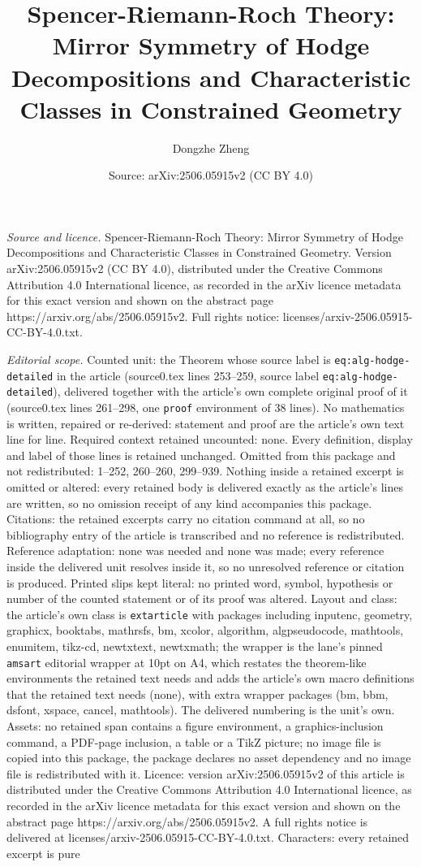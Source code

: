 \documentclass[10pt,a4paper]{amsart}
\title[Spencer-Riemann-Roch Theory: Mirror Symmetry of Hodge Decomp]{Spencer-Riemann-Roch Theory: Mirror Symmetry of Hodge Decompositions and Characteristic Classes in Constrained Geometry}
\author{Dongzhe Zheng}
\date{Source: arXiv:2506.05915v2 (CC BY 4.0)}
\begin{document}
\maketitle

\noindent\emph{Source and licence.} Spencer-Riemann-Roch Theory: Mirror Symmetry of Hodge Decompositions and Characteristic Classes in Constrained Geometry. Version arXiv:2506.05915v2 (CC BY 4.0), distributed under the Creative Commons Attribution 4.0 International licence, as recorded in the arXiv licence metadata for this exact version and shown on the abstract page https://arxiv.org/abs/2506.05915v2. Full rights notice: licenses/arxiv-2506.05915-CC-BY-4.0.txt.\par\smallskip

\noindent\textit{Editorial scope.} Counted unit: the Theorem whose source label is \texttt{eq:alg-hodge-detailed} in the article (source0.tex lines 253--259, source label \texttt{eq:alg-hodge-detailed}), delivered together with the article's own complete original proof of it (source0.tex lines 261--298, one \texttt{proof} environment of 38 lines). No mathematics is written, repaired or re-derived: statement and proof are the article's own text line for line. Required context retained uncounted: none. Every definition, display and label of those lines is retained unchanged. Omitted from this package and not redistributed: 1--252, 260--260, 299--939. Nothing inside a retained excerpt is omitted or altered: every retained body is delivered exactly as the article's lines are written, so no omission receipt of any kind accompanies this package. Citations: the retained excerpts carry no citation command at all, so no bibliography entry of the article is transcribed and no reference is redistributed. Reference adaptation: none was needed and none was made; every reference inside the delivered unit resolves inside it, so no unresolved reference or citation is produced. Printed slips kept literal: no printed word, symbol, hypothesis or number of the counted statement or of its proof was altered. Layout and class: the article's own class is \texttt{extarticle} with packages including inputenc, geometry, graphicx, booktabs, mathrsfs, bm, xcolor, algorithm, algpseudocode, mathtools, enumitem, tikz-cd, newtxtext, newtxmath; the wrapper is the lane's pinned \texttt{amsart} editorial wrapper at 10pt on A4, which restates the theorem-like environments the retained text needs and adds the article's own macro definitions that the retained text needs (none), with extra wrapper packages (bm, bbm, dsfont, xspace, cancel, mathtools). The delivered numbering is the unit's own. Assets: no retained span contains a figure environment, a graphics-inclusion command, a PDF-page inclusion, a table or a TikZ picture; no image file is copied into this package, the package declares no asset dependency and no image file is redistributed with it. Licence: version arXiv:2506.05915v2 of this article is distributed under the Creative Commons Attribution 4.0 International licence, as recorded in the arXiv licence metadata for this exact version and shown on the abstract page https://arxiv.org/abs/2506.05915v2. A full rights notice is delivered at licenses/arxiv-2506.05915-CC-BY-4.0.txt. Characters: every retained excerpt is pure 
\end{document}
